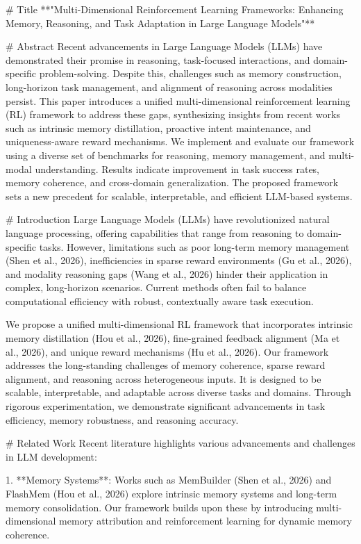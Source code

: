 # Title  
**"Multi-Dimensional Reinforcement Learning Frameworks: Enhancing Memory, Reasoning, and Task Adaptation in Large Language Models"**

# Abstract  
Recent advancements in Large Language Models (LLMs) have demonstrated their promise in reasoning, task-focused interactions, and domain-specific problem-solving. Despite this, challenges such as memory construction, long-horizon task management, and alignment of reasoning across modalities persist. This paper introduces a unified multi-dimensional reinforcement learning (RL) framework to address these gaps, synthesizing insights from recent works such as intrinsic memory distillation, proactive intent maintenance, and uniqueness-aware reward mechanisms. We implement and evaluate our framework using a diverse set of benchmarks for reasoning, memory management, and multi-modal understanding. Results indicate improvement in task success rates, memory coherence, and cross-domain generalization. The proposed framework sets a new precedent for scalable, interpretable, and efficient LLM-based systems.

# Introduction  
Large Language Models (LLMs) have revolutionized natural language processing, offering capabilities that range from reasoning to domain-specific tasks. However, limitations such as poor long-term memory management (Shen et al., 2026), inefficiencies in sparse reward environments (Gu et al., 2026), and modality reasoning gaps (Wang et al., 2026) hinder their application in complex, long-horizon scenarios. Current methods often fail to balance computational efficiency with robust, contextually aware task execution.

We propose a unified multi-dimensional RL framework that incorporates intrinsic memory distillation (Hou et al., 2026), fine-grained feedback alignment (Ma et al., 2026), and unique reward mechanisms (Hu et al., 2026). Our framework addresses the long-standing challenges of memory coherence, sparse reward alignment, and reasoning across heterogeneous inputs. It is designed to be scalable, interpretable, and adaptable across diverse tasks and domains. Through rigorous experimentation, we demonstrate significant advancements in task efficiency, memory robustness, and reasoning accuracy.

# Related Work  
Recent literature highlights various advancements and challenges in LLM development:  

1. **Memory Systems**: Works such as MemBuilder (Shen et al., 2026) and FlashMem (Hou et al., 2026) explore intrinsic memory systems and long-term memory consolidation. Our framework builds upon these by introducing multi-dimensional memory attribution and reinforcement learning for dynamic memory coherence.

